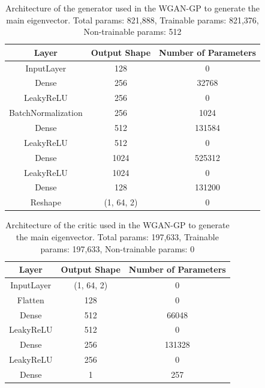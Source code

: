 \documentclass[11pt,a4paper,twoside]{report}
\begin{document}
\begin{table}[]
  \centering
  \begin{tabular}{c c c}
      \hline
      \textbf{Layer} & \textbf{Output Shape} & \textbf{Number of Parameters} \\ \hline
      InputLayer            & 128           & 0                 \\
      Dense                 & 256           & 32768             \\
      LeakyReLU             & 256           & 0                 \\
      BatchNormalization    & 256           & 1024              \\
      Dense                 & 512           & 131584            \\
      LeakyReLU             & 512           & 0                 \\
      Dense                 & 1024          & 525312            \\
      LeakyReLU             & 1024          & 0                 \\
      Dense                 & 128           & 131200            \\
      Reshape               & (1, 64, 2)    & 0                 \\
  \end{tabular}
  \caption{Architecture of the generator used in the WGAN-GP to generate the main eigenvector. Total params: 821,888, Trainable params: 821,376, Non-trainable params: 512}
  \label{tab:main_evec_generator_WGANGP_architecture}
\end{table}

\begin{table}[]
  \centering
  \begin{tabular}{c c c}
      \hline
      \textbf{Layer} & \textbf{Output Shape} & \textbf{Number of Parameters} \\ \hline
      InputLayer            & (1, 64, 2)    & 0                 \\
      Flatten               & 128           & 0                 \\
      Dense                 & 512           & 66048             \\
      LeakyReLU             & 512           & 0                 \\
      Dense                 & 256           & 131328            \\
      LeakyReLU             & 256           & 0                 \\
      Dense                 & 1             & 257               \\
  \end{tabular}
  \caption{Architecture of the critic used in the WGAN-GP to generate the main eigenvector. Total params: 197,633, Trainable params: 197,633, Non-trainable params: 0}
  \label{tab:main_evec_critic_WGANGP_architecture}
\end{table}
\end{document}
